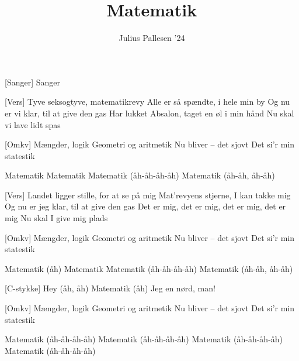 \documentclass[a4paper,11pt]{article}
\title{Matematik}
\author{Julius Pallesen '24}
\begin{document}
\maketitle

\begin{roles}
[Sanger] Sanger
\end{roles}


\begin{song}
[Vers] Tyve seksogtyve, matematikrevy
Alle er så spændte, i hele min by
Og nu er vi klar, til at give den gas
Har lukket Absalon, taget en øl i min hånd
Nu skal vi lave lidt spas

[Omkv] Mængder, logik
Geometri og aritmetik
Nu bliver – det sjovt
Det si'r min statestik

Matematik
Matematik
Matematik (åh-åh-åh-åh)
Matematik (åh-åh, åh-åh)

[Vers] Landet ligger stille, for at se på mig
Mat'revyens stjerne, I kan takke mig
Og nu er jeg klar, til at give den gas
Det er mig, det er mig, det er mig, det er mig
Nu skal I give mig plads

[Omkv] Mængder, logik
Geometri og aritmetik
Nu bliver – det sjovt
Det si'r min statestik

Matematik (åh)
Matematik
Matematik (åh-åh-åh-åh)
Matematik (åh-åh, åh-åh)

[C-stykke] Hey (åh, åh)
Matematik (åh)
Jeg en nørd, man!

[Omkv] Mængder, logik
Geometri og aritmetik
Nu bliver – det sjovt
Det si'r min statestik

Matematik (åh-åh-åh-åh)
Matematik (åh-åh-åh-åh)
Matematik (åh-åh-åh-åh)
Matematik (åh-åh-åh-åh)

\end{song}
\end{document}
